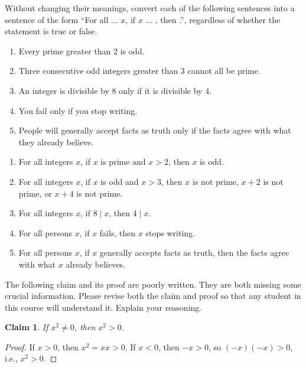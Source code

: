 \documentclass{article}
\newtheorem*{claim}{Claim}
\theoremstyle{definition}
\begin{document}
\begin{question}
   Without changing their meanings, convert each of the following sentences into a sentence of the form ``For all ... $x$, if $x$ ... , then .'', regardless of whether the statement is true or false.
    \begin{enumerate}
        \item Every prime greater than 2 is odd.
        \item Three consecutive odd integers greater than 3 cannot all be prime.
        \item An integer is divisible by 8 only if it is divisible by 4.
        \item You fail only if you stop writing.
        \item People will generally accept facts as truth only if the facts agree with what they already believe.
    \end{enumerate}
\end{question}
\begin{solution}
\begin{enumerate}
    \item For all integers $x$, if $x$ is prime and $x>2$, then $x$ is odd.
    \item For all integers $x$, if $x$ is odd and $x>3$, then $x$ is not prime, $x+2$ is not prime, or $x+4$ is not prime.
    \item For all integers $x$, if $8 \mid x$, then $4 \mid x$.
    \item For all persons $x$, if $x$ fails, then $x$ stops writing.
    \item For all persons $x$, if $x$ generally accepts facts as truth, then the facts agree with what $x$ already believes.
\end{enumerate}
\end{solution}
\begin{question}
   The following claim and its proof are poorly written. They are both missing some crucial information. 
   Please revise both the claim and proof so that any student in this course will understand it. Explain your reasoning.
      \begin{claim}
       If $x^2\neq 0$, then $x^2>0$.
      \end{claim}\begin{proof}
       If $x>0$, then $x^2=xx>0$. If $x<0$, then $-x>0$, so $(-x)(-x)>0$, i.e., $x^2>0$.
      \end{proof}
\end{question}
\end{document}
